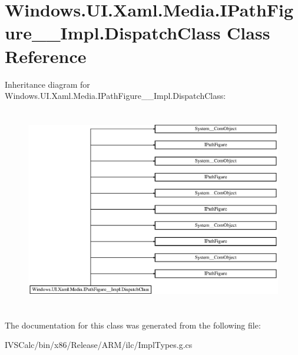 \hypertarget{class_windows_1_1_u_i_1_1_xaml_1_1_media_1_1_i_path_figure_____impl_1_1_dispatch_class}{}\section{Windows.\+U\+I.\+Xaml.\+Media.\+I\+Path\+Figure\+\_\+\+\_\+\+Impl.\+Dispatch\+Class Class Reference}
\label{class_windows_1_1_u_i_1_1_xaml_1_1_media_1_1_i_path_figure_____impl_1_1_dispatch_class}
Inheritance diagram for Windows.\+U\+I.\+Xaml.\+Media.\+I\+Path\+Figure\+\_\+\+\_\+\+Impl.\+Dispatch\+Class\+:\begin{figure}[H]
\begin{center}
\leavevmode
\includegraphics[height=8.927536cm]{class_windows_1_1_u_i_1_1_xaml_1_1_media_1_1_i_path_figure_____impl_1_1_dispatch_class}
\end{center}
\end{figure}


The documentation for this class was generated from the following file\+:\begin{DoxyCompactItemize}
\item 
I\+V\+S\+Calc/bin/x86/\+Release/\+A\+R\+M/ilc/Impl\+Types.\+g.\+cs\end{DoxyCompactItemize}
